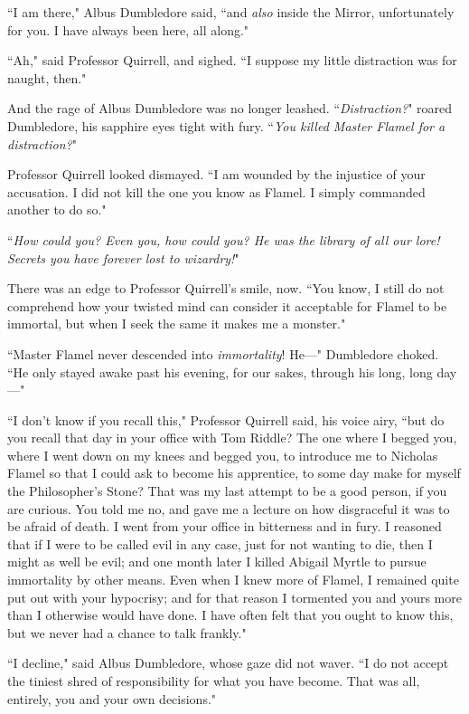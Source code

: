 ``I am there," Albus Dumbledore said, ``and \emph{also} inside the Mirror, unfortunately for you. I have always been here, all along."

``Ah," said Professor Quirrell, and sighed. ``I suppose my little distraction was for naught, then."

And the rage of Albus Dumbledore was no longer leashed. ``\emph{Distraction?}" roared Dumbledore, his sapphire eyes tight with fury. ``\emph{You killed Master Flamel for a distraction?}"

Professor Quirrell looked dismayed. ``I am wounded by the injustice of your accusation. I did not kill the one you know as Flamel. I simply commanded another to do so."

``\emph{How could you? Even you, how could you? He was the library of all our lore! Secrets you have forever lost to wizardry!}"

There was an edge to Professor Quirrell's smile, now. ``You know, I still do not comprehend how your twisted mind can consider it acceptable for Flamel to be immortal, but when I seek the same it makes me a monster."

``Master Flamel never descended into \emph{immortality}! He---" Dumbledore choked. ``He only stayed awake past his evening, for our sakes, through his long, long day---"

``I don't know if you recall this," Professor Quirrell said, his voice airy, ``but do you recall that day in your office with Tom Riddle? The one where I begged you, where I went down on my knees and begged you, to introduce me to Nicholas Flamel so that I could ask to become his apprentice, to some day make for myself the Philosopher's Stone? That was my last attempt to be a good person, if you are curious. You told me no, and gave me a lecture on how disgraceful it was to be afraid of death. I went from your office in bitterness and in fury. I reasoned that if I were to be called evil in any case, just for not wanting to die, then I might as well be evil; and one month later I killed Abigail Myrtle to pursue immortality by other means. Even when I knew more of Flamel, I remained quite put out with your hypocrisy; and for that reason I tormented you and yours more than I otherwise would have done. I have often felt that you ought to know this, but we never had a chance to talk frankly."

``I decline," said Albus Dumbledore, whose gaze did not waver. ``I do not accept the tiniest shred of responsibility for what you have become. That was all, entirely, you and your own decisions."

